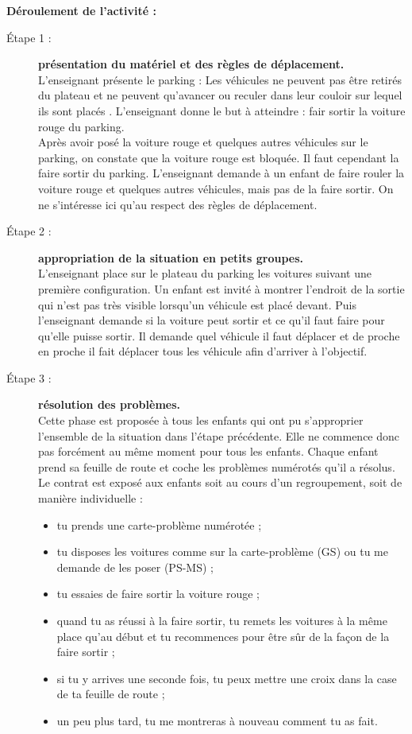 \begin{exercice*}
{\bf Déroulement de l'activité :}
\begin{description}
  \item[Étape 1 :] {\bf présentation du matériel et des règles de déplacement.} \\
  L'enseignant présente le parking : \og Les véhicules ne peuvent pas être retirés du plateau et ne peuvent qu'avancer ou reculer dans leur couloir sur lequel ils sont placés \fg. L'enseignant donne le but à atteindre : fair sortir la voiture rouge du parking. \\
  Après avoir posé la voiture rouge et quelques autres véhicules sur le parking, on constate que la voiture rouge est bloquée. Il faut cependant la faire sortir du parking. L'enseignant demande à un enfant de faire rouler la voiture rouge et quelques autres véhicules, mais pas de la faire sortir. On ne s'intéresse ici qu'au respect des règles de déplacement.
  \item[Étape 2 :] {\bf appropriation de la situation en petits groupes.} \\
  L'enseignant place sur le plateau du parking les voitures suivant une première configuration. Un enfant est invité à montrer l'endroit de la sortie qui n'est pas très visible lorsqu'un véhicule est placé devant. Puis l'enseignant demande si la voiture peut sortir et ce qu'il faut faire pour qu'elle puisse sortir. Il demande quel véhicule il faut déplacer et de proche en proche il fait déplacer tous les véhicule afin d'arriver à l'objectif.
  \item[Étape 3 :] {\bf résolution des problèmes.} \\
  Cette phase est proposée à tous les enfants qui ont pu s'approprier l'ensemble de la situation dans l'étape précédente. Elle ne commence donc pas forcément au même moment pour tous les enfants. Chaque enfant prend sa feuille de route et coche les problèmes numérotés qu'il a résolus. Le contrat est exposé aux enfants soit au cours d'un regroupement, soit de manière individuelle :
  \begin{itemize}
     \item tu prends une carte-problème numérotée ;
     \item tu disposes les voitures comme sur la carte-problème (GS) ou tu me demande de les poser (PS-MS) ;
     \item tu essaies de faire sortir la voiture rouge ;
     \item quand tu as réussi à la faire sortir, tu remets les voitures à la même place qu'au début et tu recommences pour être sûr de la façon de la faire sortir ;
     \item si tu y arrives une seconde fois, tu peux mettre une croix dans la case de ta feuille de route ;
     \item un peu plus tard, tu me montreras à nouveau comment tu as fait. \\
  \end{itemize}
\end{description}


\end{exercice*}
